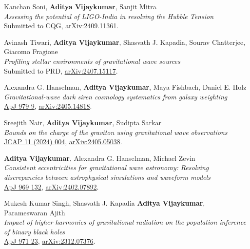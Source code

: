 \begin{etaremune}
        \item Kanchan Soni, \textbf{Aditya Vijaykumar}, Sanjit Mitra\\
        \textit{Assessing the potential of LIGO-India in resolving the Hubble Tension}\\
        Submitted to CQG, \href{https://arxiv.org/abs/2409.11361}{arXiv:2409.11361}.
        
        \item Avinash Tiwari, \textbf{Aditya Vijaykumar}, Shasvath J. Kapadia, Sourav Chatterjee, Giacomo Fragione\\
        \textit{Profiling stellar environments of gravitational wave sources}\\
        Submitted to PRD, \href{https://arxiv.org/abs/2407.15117}{arXiv:2407.15117}.
        
	\item
	Alexandra G. Hanselman, \textbf{Aditya Vijaykumar}, Maya Fishbach, Daniel E. Holz  \\
	\textit{Gravitational-wave dark siren cosmology systematics from galaxy weighting}\\
	\href{https://iopscience.iop.org/article/10.3847/1538-4357/ad9393}{ApJ 979 9}, \href{https://arxiv.org/abs/2405.14818}{arXiv:2405.14818}.

	\item
	Sreejith Nair, \textbf{Aditya Vijaykumar}, Sudipta Sarkar  \\
	\textit{Bounds on the charge of the graviton using gravitational wave observations}\\
	\href{https://iopscience.iop.org/article/10.1088/1475-7516/2024/11/004}{JCAP 11 (2024) 004}, \href{https://arxiv.org/abs/2405.05038}{arXiv:2405.05038}.
	
	\item
	 \textbf{Aditya Vijaykumar}, Alexandra G. Hanselman, Michael Zevin  \\
	\textit{Consistent eccentricities for gravitational wave astronomy: Resolving discrepancies between astrophysical simulations and waveform models}\\
	\href{https://iopscience.iop.org/article/10.3847/1538-4357/ad4455}{ApJ 969 132}, \href{https://arxiv.org/abs/2402.07892}{arXiv:2402.07892}.

	\item
	Mukesh Kumar Singh, Shasvath J. Kapadia \textbf{Aditya Vijaykumar}, Parameswaran Ajith  \\
	\textit{Impact of higher harmonics of gravitational radiation on the population inference of binary black holes}\\
	\href{https://iopscience.iop.org/article/10.3847/1538-4357/ad499b}{ApJ 971 23}, \href{https://arxiv.org/abs/2312.07376}{arXiv:2312.07376}.


\end{etaremune}
